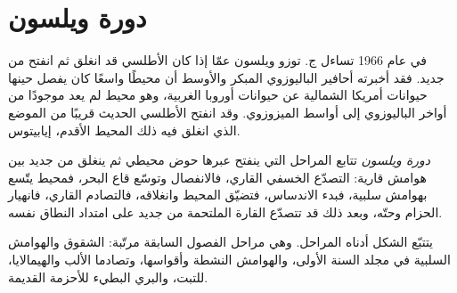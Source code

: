 \begin{omfigure}
\par{}
\end{omfigure}

\section{دورة ويلسون}\label{sec:b2:wilson-cycle:cycle}

في عام 1966 تساءل ج. توزو ويلسون عمّا إذا كان الأطلسي قد انغلق ثم
انفتح من جديد. فقد أخبرته أحافير الباليوزوي المبكر والأوسط أن محيطًا واسعًا كان يفصل حينها
حيوانات أمريكا الشمالية عن حيوانات أوروبا الغربية، وهو محيط لم يعد
موجودًا من أواخر الباليوزوي إلى أواسط الميزوزوي. وقد انفتح الأطلسي الحديث
قريبًا من الموضع الذي انغلق فيه ذلك المحيط الأقدم، إيابيتوس.

\begin{definition}\label{def:b2:wilson-cycle:wilson}
\emph{دورة ويلسون} تتابع المراحل التي ينفتح عبرها
حوض محيطي ثم ينغلق من جديد بين هوامش قارية: التصدّع الخسفي القاري،
فالانفصال وتوسّع قاع البحر، فمحيط يتّسع بهوامش سلبية، فبدء
الاندساس، فتضيّق المحيط وانغلاقه، فالتصادم القاري، فانهيار الحزام
وحتّه، وبعد ذلك قد تتصدّع القارة الملتحمة من جديد على امتداد النطاق نفسه.
\end{definition}

يتتبّع الشكل أدناه المراحل. وهي مراحل الفصول السابقة مرتّبة:
الشقوق والهوامش السلبية في مجلد السنة الأولى، والهوامش النشطة وأقواسها،
وتصادما الألب والهيمالايا،  للتبت، والبري البطيء
للأحزمة القديمة.


